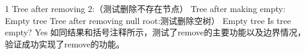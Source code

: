 \documentclass[UTF8]{ctexart}
\begin{document}
1\newline
Tree after removing 2:（测试删除不存在节点）\newline
Tree after making empty:\newline
Empty tree\newline
Tree after removing null root:测试删除空树）\newline
Empty tree\newline
Is tree empty? Yes\newline
如同结果和括号注释所示，测试了remove的主要功能以及边界情况，验证成功实现了remove的功能。
\end{document}
